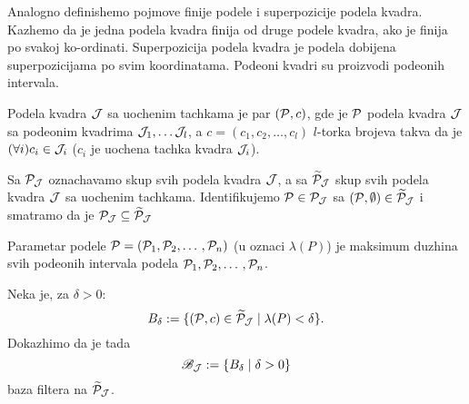 \documentclass[../main.tex]{subfiles}
\begin{document}
    Analogno definishemo pojmove finije podele i superpozicije podela kvadra. Kazhemo da je jedna podela kvadra finija od druge podele kvadra, ako je \zn finija po svakoj ko-ordinati\zng. 
    Superpozicija podela kvadra je podela dobijena superpozicijama \zn po svim koordinatama\zng. Podeoni kvadri su proizvodi podeonih intervala.

    \begin{de}
    	Podela kvadra $\mathcal{J}$ sa uochenim tachkama je par $(\mathcal{P},c)$, gde je $\mathcal{P}$ podela kvadra $\mathcal{J}$ sa podeonim kvadrima $\mathcal{J}_1,\dotso\mathcal{J}_l$,
	a $c=(c_1,c_2,\dotso,c_l)$ $l$-torka brojeva takva da je $(\forall i)c_i\in\mathcal{J}_i$ ($c_i$ je uochena tachka kvadra $\mathcal{J}_i$).
    \end{de}

    Sa $\mathcal{P}_\mathcal{J}$ oznachavamo skup svih podela kvadra $\mathcal{J}$, a sa $\widetilde{\mathcal{P}}_\mathcal{J}$ skup svih podela kvadra $\mathcal{J}$ sa uochenim tachkama.
    Identifikujemo $\mathcal{P}\in \mathcal{P}_\mathcal{J}$ sa $(\mathcal{P},\emptyset)\in \widetilde{\mathcal{P}}_\mathcal{J}$ i smatramo da je $\mathcal{P}_\mathcal{J}\subseteq\widetilde{\mathcal{P}}_\mathcal{J}$
    
    \begin{de}
    	Parametar podele $\mathcal{P}=(\mathcal{P}_1,\mathcal{P}_2,\dotso, \mathcal{P}_n)$ (u oznaci $\lambda(P)$) je maksimum duzhina svih podeonih intervala podela $\mathcal{P}_1,\mathcal{P}_2,\dotso, \mathcal{P}_n$.
    \end{de}

    Neka je, za $\delta>0$:
    \[B_\delta := \{(\mathcal{P},c)\in \widetilde{\mathcal{P}}_\mathcal{J}\mid \lambda(P)<\delta\}.\]
    Dokazhimo da je tada
    \[\mathscr{B}_\mathcal{J}:=\{B_\delta \mid \delta > 0\}\]
    baza filtera na $\widetilde{\mathcal{P}}_\mathcal{J}$. 
\end{document}
